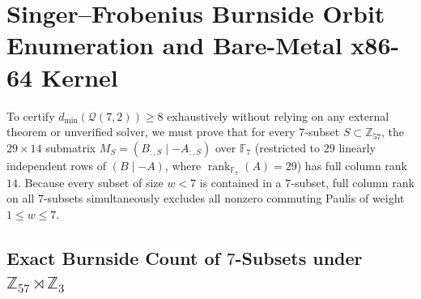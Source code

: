 \documentclass[11pt,letterpaper]{article}
\theoremstyle{plain}
\theoremstyle{definition}
\theoremstyle{remark}
\newcommand{\F}{\mathbb{F}}
\newcommand{\Z}{\mathbb{Z}}
\newcommand{\Qcode}{\mathcal{Q}}
\begin{document}
\section{Singer--Frobenius Burnside Orbit Enumeration and Bare-Metal x86-64 Kernel}
\label{app:burnside}

To certify $d_{\min}(\Qcode(7,2))\ge 8$ exhaustively without relying on any external theorem or unverified solver, we must prove that for every $7$-subset $S\subset \Z_{57}$, the $29\times 14$ submatrix $M_S=(B_{:,S}\mid -A_{:,S})$ over $\F_7$ (restricted to $29$ linearly independent rows of $(B\mid -A)$, where $\operatorname{rank}_{\F_7}(A)=29$) has full column rank $14$. Because every subset of size $w<7$ is contained in a $7$-subset, full column rank on all $7$-subsets simultaneously excludes all nonzero commuting Paulis of weight $1\le w\le 7$.

\subsection{Exact Burnside Count of \texorpdfstring{$7$}{7}-Subsets under \texorpdfstring{$\Z_{57}\rtimes\Z_3$}{Z\_57 x| Z\_3}}
\end{document}
